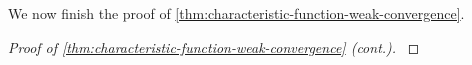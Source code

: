 We now finish the proof of \autoref{thm:characteristic-function-weak-convergence}.

\begin{proof}[Proof of \autoref{thm:characteristic-function-weak-convergence} (cont.)]\label{pf:thm:characteristic-function-weak-convergence}

\end{proof}